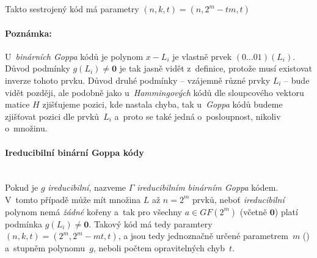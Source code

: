 \documentclass[thesis=M,czech,hidelinks]{FITthesis}[2012/06/26]
\newcommand{\0}{{\textcolor[gray]{0.75}{0}}}
\begin{document}
Takto sestrojený kód má parametry $(n,k,t) = (n,2^m-tm,t)$

\paragraph{Poznámka:} U~\emph{binárních Goppa} kódů je polynom $x - L_i$ je
vlastně prvek $(0\ldots01)(L_i)$. Důvod podmínky $g(L_i) \neq \mathbf{0}$ je tak
jasně vidět z~definice, protože musí existovat inverze tohoto prvku. Důvod druhé
podmínky -- vzájemně různé prvky $L_i$ -- bude vidět později, ale podobně jako
u~\emph{Hammingových} kódů dle sloupcového vektoru matice $H$ zjišťujeme pozici,
kde nastala chyba, tak u~\emph{Goppa} kódů budeme zjišťovat pozici dle
prvků~$L_i$ a~proto se také jedná o~posloupnost, nikoliv o~množinu.

\paragraph{Ireducibilní binární Goppa kódy} \hfil \\
Pokud je $g$ \emph{ireducibilní}, nazveme $\Gamma$ \emph{ireducibilním
binárním Goppa} kódem. V~tomto případě může mít množina $L$ až $n=2^m$ prvků,
neboť \emph{ireducibilní} polynom nemá \emph{žádné} kořeny a~tak pro všechny
$a \in GF(2^m)$ (včetně $\mathbf{0}$) platí podmínka $g(L_i) \neq \mathbf{0}$.
Takový kód má tedy paramtery $(n,k,t) = ( 2^m, 2^m - mt, t )$, a jsou tedy
jednoznačně určené parametrem~$m$ () a~stupněm
polynomu~$g$, neboli počtem opravitelných chyb~$t$.
\end{document}
